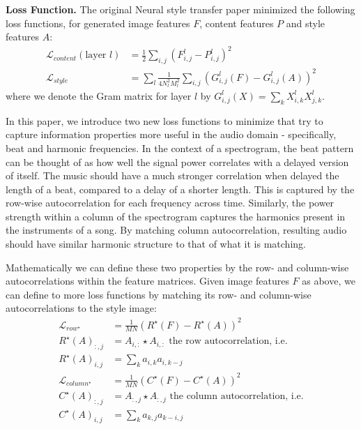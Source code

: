 \documentclass{article}
\begin{document}
\textbf{Loss Function.} \hspace{0.25cm} The original Neural style transfer paper minimized the following loss functions, for generated image features $F$, content features $P$ and style features $A$:
\begin{align*}
\mathcal{L}_{content}(\text{layer } l) &= \frac{1}{2} \sum_{i, j} (F_{i, j}^{l} - P_{i, j}^{l})^2 \\
\mathcal{L}_{style} &= \sum_l \frac{1}{4N_l^2M_l^2}\sum_{i,j}(G_{i,j}^l(F) - G_{i,j}^l(A))^2
\end{align*}
where we denote the Gram matrix for layer $l$ by $G_{i,j}^l(X) = \sum_k X_{i,k}^l X_{j,k}^l$. 

In this paper, we introduce two new loss functions to minimize that try to capture information properties more useful in the audio domain - specifically, beat and harmonic frequencies. In the context of a spectrogram, the beat pattern can be thought of as how well the signal power correlates with a delayed version of itself.  The music should have a much stronger correlation when delayed the length of a beat, compared to a delay of a shorter length. This is captured by the row-wise autocorrelation for each frequency across time. Similarly, the power strength within a column of the spectrogram captures the harmonics present in the instruments of a song. By matching column autocorrelation, resulting audio should have similar harmonic structure to that of what it is matching.

Mathematically we can define these two properties by the row- and column-wise autocorrelations within the feature matrices. Given image features $F$ as above, we can define to more loss functions by matching its row- and column-wise autocorrelations to the style image:
\begin{align*}
\mathcal{L}_{row^\star} &= \frac{1}{MN} (R^\star(F) - R^\star(A))^2 \\
R^\star(A)_{:,j} &= A_{i,:} \star A_{i,:} \text{ the row autocorrelation, i.e.} \\
R^\star(A)_{i,j} &= \sum_k a_{i,k}a_{i,k-j} \\
\mathcal{L}_{column^\star} &= \frac{1}{MN} (C^\star(F) - C^\star(A))^2 \\
C^\star(A)_{:,j} &= A_{:,j} \star A_{:,j} \text{ the column autocorrelation, i.e.} \\
C^\star(A)_{i,j} &= \sum_k a_{k,j}a_{k-i,j} \\
\end{align*}
\end{document}
